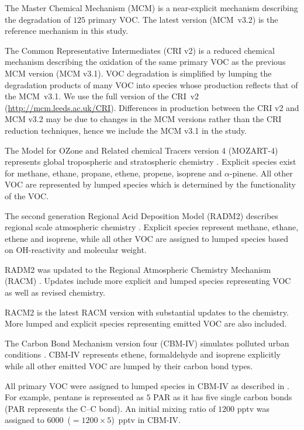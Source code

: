 The Master Chemical Mechanism (MCM) \citep{Jenkin:1997, Jenkin:2003, Saunders:2003, Bloss:2005, MCM_Site} is a near-explicit mechanism describing the degradation of $125$ primary VOC. 
The latest version (\mbox{MCM v3.2}) is the reference mechanism in this study.

The Common Representative Intermediates (CRI v2) \citep{Jenkin:2008} is a reduced chemical mechanism describing the oxidation of the same primary VOC as the previous MCM version (MCM v3.1). 
VOC degradation is simplified by lumping the degradation products of many VOC into species whose  production reflects that of the \mbox{MCM v3.1}. 
We use the full version of the \mbox{CRI v2} (\url{http://mcm.leeds.ac.uk/CRI}).  
Differences in  production between the CRI v2 and MCM v3.2 may be due to changes in the MCM versions rather than the CRI reduction techniques, hence we include the MCM v3.1 in the study.

The Model for OZone and Related chemical Tracers version 4 (MOZART-4) represents global tropospheric and stratospheric chemistry \citep{Emmons:2010}. 
Explicit species exist for methane, ethane, propane, ethene, propene, isoprene and $\alpha$-pinene.
All other VOC are represented by lumped species which is determined by the functionality of the VOC.

The second generation Regional Acid Deposition Model (RADM2) describes regional scale atmospheric chemistry \citep{Stockwell:1990}. 
Explicit species represent methane, ethane, ethene and isoprene, while all other VOC are assigned to lumped species based on OH-reactivity and molecular weight.

RADM2 was updated to the Regional Atmospheric Chemistry Mechanism (RACM) \citep{Stockwell:1997}. 
Updates include more explicit and lumped species representing VOC as well as revised chemistry.

RACM2 is the latest RACM version \citep{Goliff:2013} with substantial updates to the chemistry. 
More lumped and explicit species representing emitted VOC are also included.

The Carbon Bond Mechanism version four (CBM-IV) simulates polluted urban conditions \citep{Gery:1989}. 
CBM-IV represents ethene, formaldehyde and isoprene explicitly while all other emitted VOC are lumped by their carbon bond types. 

All primary VOC were assigned to lumped species in CBM-IV as described in \citet{Hogo:1989}. 
For example, pentane is represented as $5$ PAR as it has five single carbon bonds (PAR represents the C--C bond).
An initial mixing ratio of $1200$ pptv was assigned to \mbox{$6000$ ($= 1200 \times 5$) pptv} in CBM-IV.

